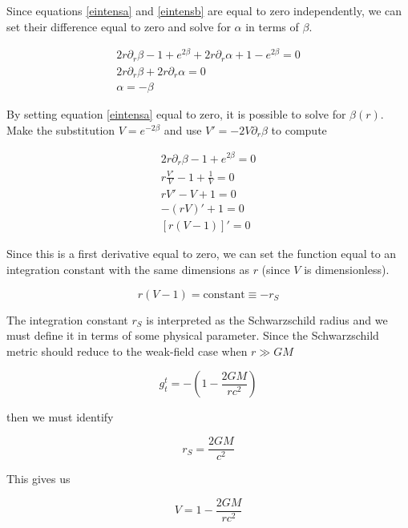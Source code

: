 \documentclass[12pt]{extarticle}
\begin{document}
Since equations \ref{eintensa} and \ref{eintensb} are equal to zero independently, we can set their difference equal to zero and solve for $\alpha$ in terms of $\beta$.

\begin{equation}
\begin{split}
2r\partial_r\beta - 1 +e^{2\beta} + 2r\partial_r\alpha + 1 - e^{2\beta} = 0 \\ 
2r\partial_r\beta + 2r\partial_r\alpha = 0 \\
\alpha = -\beta
\end{split}
\end{equation}

By setting equation \ref{eintensa} equal to zero, it is possible to solve for $\beta(r)$. Make the substitution $V=e^{-2\beta}$ and use $V'=-2V\partial_r\beta$ to compute

\begin{equation}
\begin{split}
2r\partial_r\beta-1+e^{2\beta}=0 \\
r\frac{V'}{V}-1+\frac{1}{V}=0 \\
rV' - V + 1 = 0 \\
-(rV)' + 1 = 0 \\
[r(V-1)]' = 0
\end{split}
\end{equation}

Since this is a first derivative equal to zero, we can set the function equal to an integration constant with the same dimensions as $r$ (since $V$ is dimensionless).

\begin{equation}
r(V-1) = \text{constant} \equiv -r_S
\end{equation}

The integration constant $r_S$ is interpreted as the Schwarzschild radius and we must define it in terms of some physical parameter. Since the Schwarzschild metric should reduce to the weak-field case when $r \gg GM$

\begin{equation}
g_t^t = -\left(1-\frac{2GM}{rc^2}\right)
\end{equation}

then we must identify

\begin{equation}
r_S = \frac{2GM}{c^2}
\end{equation}

This gives us

\begin{equation}
V = 1 - \frac{2GM}{rc^2}
\end{equation}
\end{document}
